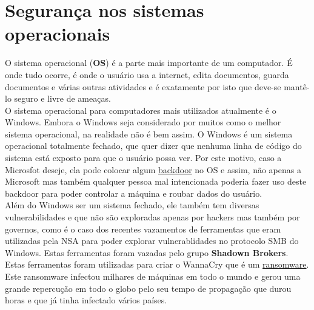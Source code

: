 \documentclass[12pt, letterpaper, Monospace:12]{report}
\begin{document}
\pagebreak

\section{Segurança nos sistemas operacionais}
	O sistema operacional (\textbf{OS}) é a parte mais importante de um computador. É onde tudo ocorre, é onde o usuário usa a internet, edita documentos, guarda documentos e várias outras atividades e é exatamente por isto que deve-se mantê-lo seguro e livre de ameaças.\\

	O sistema operacional para computadores mais utilizados atualmente é o Windows. Embora o Windows seja considerado por muitos como o melhor sistema operacional, na realidade não é bem assim. O Windows é um sistema operacional totalmente fechado, que quer dizer que nenhuma linha de código do sistema está exposto para que o usuário possa ver. Por este motivo, caso a Microsfot  deseje, ela pode colocar algum \href{https://criptowiki.miraheze.org/wiki/Backdoors}{backdoor} no OS e assim, não apenas a Microsoft mas também qualquer pessoa mal intencionada poderia fazer uso deste backdoor para poder controlar a máquina e roubar dados do usuário.\\

	Além do Windows ser um sistema fechado, ele também tem diversas vulnerabilidades e que não são exploradas apenas por hackers mas também por governos, como é o caso dos recentes vazamentos de ferramentas que eram utilizadas pela NSA para poder explorar vulnerablidades no protocolo SMB do Windows. Estas ferramentas foram vazadas pelo grupo \textbf{Shadown Brokers}. Estas ferramentas foram utilizadas para criar o WannaCry que é um \href{https://criptowiki.miraheze.org/wiki/Ransomwares}{ransomware}. Este ransomware infectou milhares de máquinas em todo o mundo e gerou uma grande repercução em todo o globo pelo seu tempo de propagação que durou horas e que já tinha infectado vários países.\\
\end{document}
